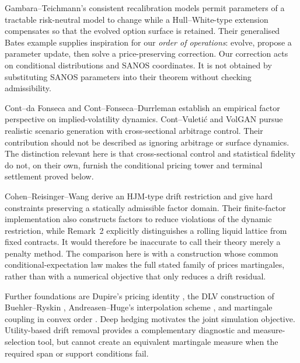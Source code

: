 \documentclass[11pt,a4paper]{article}
\numberwithin{equation}{section}
\theoremstyle{definition}\newtheorem{definition}[theorem]{Definition}
\theoremstyle{remark}\newtheorem{remark}[theorem]{Remark}
\begin{document}
Gambara--Teichmann's consistent recalibration models \cite{CRC} permit parameters of a tractable risk-neutral model to change while a Hull--White-type extension compensates so that the evolved option surface is retained. Their generalised Bates example supplies inspiration for our \emph{order of operations}: evolve, propose a parameter update, then solve a price-preserving correction. Our correction acts on conditional distributions and SANOS coordinates. It is not obtained by substituting SANOS parameters into their theorem without checking admissibility.

Cont--da Fonseca \cite{ContFonseca} and Cont--Fonseca--Durrleman \cite{CFD} establish an empirical factor perspective on implied-volatility dynamics. Cont--Vuleti\'c \cite{ContVuletic} and VolGAN \cite{VolGAN} pursue realistic scenario generation with cross-sectional arbitrage control. Their contribution should not be described as ignoring arbitrage or surface dynamics. The distinction relevant here is that cross-sectional control and statistical fidelity do not, on their own, furnish the conditional pricing tower and terminal settlement proved below.

Cohen--Reisinger--Wang \cite{CRW} derive an HJM-type drift restriction and give hard constraints preserving a statically admissible factor domain. Their finite-factor implementation also constructs factors to reduce violations of the dynamic restriction, while Remark~2 explicitly distinguishes a rolling liquid lattice from fixed contracts. It would therefore be inaccurate to call their theory merely a penalty method. The comparison here is with a construction whose common conditional-expectation law makes the full stated family of prices martingales, rather than with a numerical objective that only reduces a drift residual.

Further foundations are Dupire's pricing identity \cite{Dupire}, the DLV construction of Buehler--Ryskin \cite{DLV}, Andreasen--Huge's interpolation scheme \cite{AH}, and martingale coupling in convex order \cite{Strassen,Kellerer}. Deep hedging \cite{DeepHedging} motivates the joint simulation objective. Utility-based drift removal \cite{OCE} provides a complementary diagnostic and measure-selection tool, but cannot create an equivalent martingale measure when the required span or support conditions fail.
\end{document}
